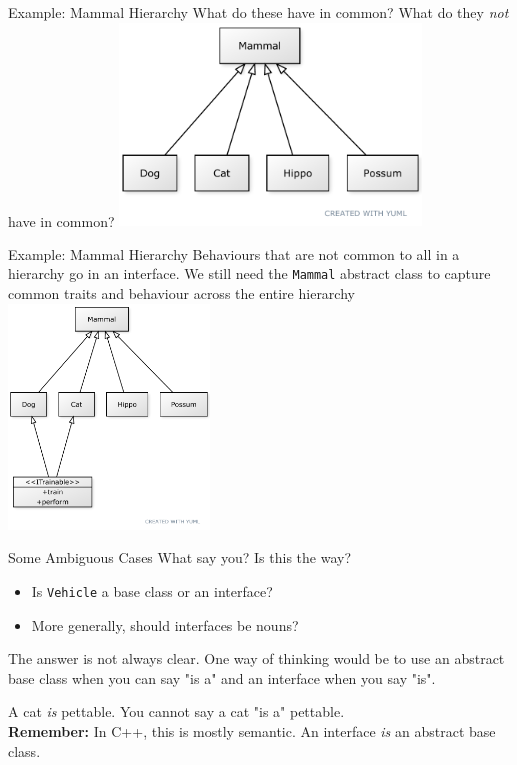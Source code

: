 \documentclass[10pt,xcolor={table,dvipsnames},t]{beamer}
\begin{document}
\begin{frame}[c]{Example: Mammal Hierarchy}
What do these have in common? What do they \textit{not} have in common?
\center
\includegraphics[width=0.6\textwidth]{animal-hierarchy.pdf}
\end{frame}

\begin{frame}[c]{Example: Mammal Hierarchy}
Behaviours that are not common to all in a hierarchy go in 
an interface. We still need the \texttt{Mammal} abstract class
to capture common traits and behaviour across the entire hierarchy
\center \includegraphics[width=0.4\textwidth]{perform.pdf}
\end{frame}
\begin{frame}[c]{Some Ambiguous Cases}
What say you? Is this the way?
\begin{itemize}
	\item Is \texttt{Vehicle} a base class or an interface?
	\item More generally, should interfaces be nouns?
\end{itemize}
\vspace{0.2cm}
The answer is not always clear. One way of thinking would be to use
an abstract base class when you can say "is a" and an interface when you say
"is".

A cat \textit{is} pettable. You cannot say a cat "is a" pettable.\\
\textbf{Remember:} In C++, this is mostly semantic. An interface \textit{is} an abstract base class.


\end{frame}
\end{document}
